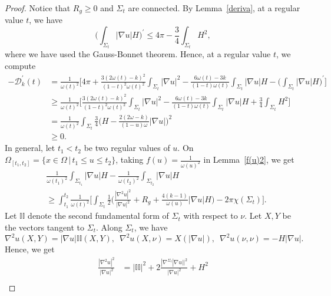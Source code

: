 \documentclass[12pt]{article}
\theoremstyle{definition}
\theoremstyle{plain}
\numberwithin{equation}{section}
\begin{document}
\begin{proof}
Notice that $ R_{g}\geq 0 $ and $ \Sigma_{t} $ are connected. By Lemma~\ref{deriva}, at a regular value $ t $,  we have 
\begin{equation}\label{de leq}
\Big(\int_{\Sigma_{t}}|\nabla u|H\Big)^{\prime}\leq 4\pi-\frac{3}{4}\int_{\Sigma_{t}}H^{2},
\end{equation}
where we have used the Gauss-Bonnet theorem. Hence, at a regular value $ t $, we compute
$$
\begin{aligned}
-\mathcal{D}_{k}^{\prime}(t)&=\frac{1}{\omega(t)^{2}}\Big[4\pi+\frac{3(2\omega(t)-k)^{2}}{(1-t)^{2}\omega(t)^{2}}\int_{\Sigma_{t}}|\nabla u|^{2}-\frac{6\omega(t)-3k}{(1-t)\omega(t)}\int_{\Sigma_{t}}|\nabla u|H-\Big(\int_{\Sigma_{t}}|\nabla u|H\Big)^{\prime}\Big]\\
&\geq \frac{1}{\omega(t)^{2}}\Big[\frac{3(2\omega(t)-k)^{2}}{(1-t)^{2}\omega(t)^{2}}\int_{\Sigma_{t}}|\nabla u|^{2}-\frac{6\omega(t)-3k}{(1-t)\omega(t)}\int_{\Sigma_{t}}|\nabla u|H+\frac{3}{4}\int_{\Sigma_{t}}H^{2}\Big]\\
&=\frac{1}{\omega(t)^{2}}\int_{\Sigma_{t}}\frac{3}{4}\Big(H-\frac{2(2\omega-k)}{(1-u)\omega}|\nabla u|\Big)^{2}\\
&\geq 0.
\end{aligned}
$$
In general, let $ t_{1}<t_{2} $ be two regular values of $ u $. On $ \Omega_{[t_{1},t_{2}]}=\{x\in \Omega\,|\, t_{1}\leq u\leq t_{2} \} $, taking $ f(u)=\frac{1}{\omega(u)^{2}} $ in Lemma~\ref{f(u)2}, we get
\begin{equation}\label{H f}
\begin{aligned}
&\frac{1}{\omega(t_{1})^{2}}\int_{\Sigma_{t_{1}}}|\nabla u|H-\frac{1}{\omega(t_{2})^{2}}\int_{\Sigma_{t_{2}}}|\nabla u|H\\
&\geq \int_{t_{1}}^{t_{2}}\frac{1}{\omega(t)^{2}}\Big[\int_{\Sigma_{t}}\frac{1}{2}\Big(\frac{|\nabla^{2}u|^{2}}{|\nabla u|^{2}}+R_{g}+\frac{4(k-1)}{\omega(u)}|\nabla u|H\Big)-2\pi\chi(\Sigma_{t})\Big].
\end{aligned}
\end{equation}
Let $ \mathbb{II} $ denote the second fundamental form of $ \Sigma_{t} $ with respect to $ \nu $. Let $ X, Y $ be the vectors tangent to $ \Sigma_{t} $. Along $ \Sigma_{t} $, we have
$$
\nabla^{2}u(X,Y)=|\nabla u|\mathbb{II}(X,Y),\,\,\,\nabla^{2}u(X,\nu)=X(|\nabla u|),\,\,\,\nabla^{2}u(\nu,\nu)=-H|\nabla u|.
$$
Hence, we get
\begin{equation}\label{hess}
\begin{aligned}
\frac{|\nabla^{2}u|^{2}}{|\nabla u|^{2}}&=|\mathbb{II}|^{2}+2\frac{|\nabla^{\Sigma_{t}}|\nabla u||^{2}}{|\nabla u|^{2}}+H^{2}\\

\end{aligned}
\end{equation}
\end{proof}
\end{document}
